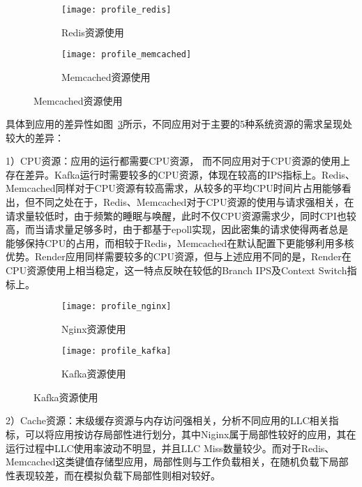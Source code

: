 \begin{figure}[H]
    \centering
    \begin{subfigure}[b]{0.9\textwidth}
      \texttt{[image: profile\_redis]}
      \caption{Redis资源使用}
      \label{fig:profile_redis}
    \end{subfigure}
    \begin{subfigure}[b]{0.9\textwidth}
        \texttt{[image: profile\_memcached]}
        \caption{Memcached资源使用}
        \label{fig:profile_memcached}
    \end{subfigure}
\label{fig:resource_affinity_0}
\end{figure}

具体到应用的差异性如图~\ref{fig:resource_affinity_0}所示，不同应用对于主要的5种系统资源的需求呈现处较大的差异：

1）CPU资源：应用的运行都需要CPU资源， 而不同应用对于CPU资源的使用上存在差异。Kafka运行时需要较多的CPU资源，体现在较高的IPS指标上。Redis、Memcached同样对于CPU资源有较高需求，从较多的平均CPU时间片占用能够看出，但不同之处在于，Redis、Memcached对于CPU资源的使用与请求强相关，在请求量较低时，由于频繁的睡眠与唤醒，此时不仅CPU资源需求少，同时CPI也较高，而当请求量足够多时，由于都基于epoll实现，因此密集的请求使得两者总是能够保持CPU的占用，而相较于Redis，Memcached在默认配置下更能够利用多核优势。Render应用同样需要较多的CPU资源，但与上述应用不同的是，Render在CPU资源使用上相当稳定，这一特点反映在较低的Branch IPS及Context Switch指标上。

\begin{figure}[H]
    \centering
    \begin{subfigure}[b]{0.9\textwidth}
      \texttt{[image: profile\_nginx]}
      \caption{Nginx资源使用}
      \label{fig:profile_nginx}
    \end{subfigure}
    \begin{subfigure}[b]{0.9\textwidth}
        \texttt{[image: profile\_kafka]}
        \caption{Kafka资源使用}
        \label{fig:profile_kafka}
    \end{subfigure}
\label{fig:resource_affinity_1}
\end{figure}

2）Cache资源：末级缓存资源与内存访问强相关，分析不同应用的LLC相关指标，可以将应用按访存局部性进行划分，其中Niginx属于局部性较好的应用，其在运行过程中LLC使用率波动不明显，并且LLC Miss数量较少。而对于Redis、Memcached这类键值存储型应用，局部性则与工作负载相关，在随机负载下局部性表现较差，而在模拟负载下局部性则相对较好。


